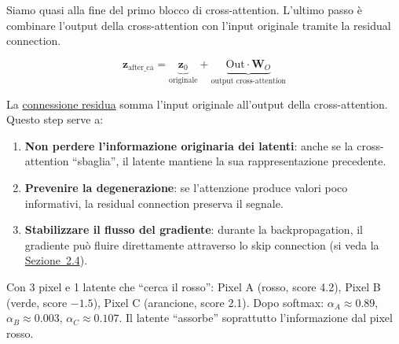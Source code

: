 \documentclass[12pt,a4paper]{article}
\begin{document}
Siamo quasi alla fine del primo blocco di cross-attention. L'ultimo passo \`e combinare l'output della cross-attention con l'input originale tramite la residual connection.

\[
    \mathbf{z}_{\text{after\_ca}} = \underbrace{\mathbf{z}_0}_{\text{originale}} + \underbrace{\text{Out} \cdot \mathbf{W}_O}_{\text{output cross-attention}}
\]

La \hyperref[sec:residual]{connessione residua} somma l'input originale all'output della cross-attention. Questo step serve a:
\begin{enumerate}
    \item \textbf{Non perdere l'informazione originaria dei latenti}: anche se la cross-attention ``sbaglia'', il latente mantiene la sua rappresentazione precedente.
    \item \textbf{Prevenire la degenerazione}: se l'attenzione produce valori poco informativi, la residual connection preserva il segnale.
    \item \textbf{Stabilizzare il flusso del gradiente}: durante la backpropagation, il gradiente pu\`o fluire direttamente attraverso lo skip connection (si veda la \hyperref[sec:residual]{Sezione~2.4}).
\end{enumerate}

\begin{examplebox}
Con 3 pixel e 1 latente che ``cerca il rosso'': Pixel A (rosso, score 4.2), Pixel B (verde, score $-1.5$), Pixel C (arancione, score 2.1). Dopo softmax: $\alpha_A \approx 0.89$, $\alpha_B \approx 0.003$, $\alpha_C \approx 0.107$. Il latente ``assorbe'' soprattutto l'informazione dal pixel rosso.
\end{examplebox}
\end{document}
